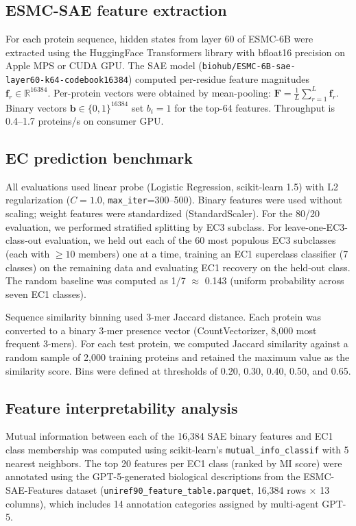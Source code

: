 \documentclass[12pt,a4paper]{article}
\begin{document}
\subsection{ESMC-SAE feature extraction}

For each protein sequence, hidden states from layer 60 of ESMC-6B were extracted using the HuggingFace Transformers library with bfloat16 precision on Apple MPS or CUDA GPU. The SAE model (\texttt{biohub/ESMC-6B-sae-}\\\texttt{layer60-k64-codebook16384}) computed per-residue feature magnitudes $\mathbf{f}_r \in \mathbb{R}^{16384}$. Per-protein vectors were obtained by mean-pooling: $\mathbf{F} = \frac{1}{L}\sum_{r=1}^{L} \mathbf{f}_r$. Binary vectors $\mathbf{b} \in \{0,1\}^{16384}$ set $b_i = 1$ for the top-64 features. Throughput is 0.4--1.7 proteins/s on consumer GPU.

\subsection{EC prediction benchmark}

All evaluations used linear probe (Logistic Regression, scikit-learn 1.5) with L2 regularization ($C=1.0$, \texttt{max\_iter}=300--500). Binary features were used without scaling; weight features were standardized (StandardScaler). For the 80/20 evaluation, we performed stratified splitting by EC3 subclass. For leave-one-EC3-class-out evaluation, we held out each of the 60 most populous EC3 subclasses (each with $\ge10$ members) one at a time, training an EC1 superclass classifier (7 classes) on the remaining data and evaluating EC1 recovery on the held-out class. The random baseline was computed as 1/7 $\approx$ 0.143 (uniform probability across seven EC1 classes).

Sequence similarity binning used 3-mer Jaccard distance. Each protein was converted to a binary 3-mer presence vector (CountVectorizer, 8,000 most frequent 3-mers). For each test protein, we computed Jaccard similarity against a random sample of 2,000 training proteins and retained the maximum value as the similarity score. Bins were defined at thresholds of 0.20, 0.30, 0.40, 0.50, and 0.65.

\subsection{Feature interpretability analysis}

Mutual information between each of the 16,384 SAE binary features and EC1 class membership was computed using scikit-learn's \texttt{mutual\_info\_classif} with 5 nearest neighbors. The top 20 features per EC1 class (ranked by MI score) were annotated using the GPT-5-generated biological descriptions from the ESMC-SAE-Features dataset (\texttt{uniref90\_feature\_table.parquet}, 16,384 rows $\times$ 13 columns), which includes 14 annotation categories assigned by multi-agent GPT-5.
\end{document}
